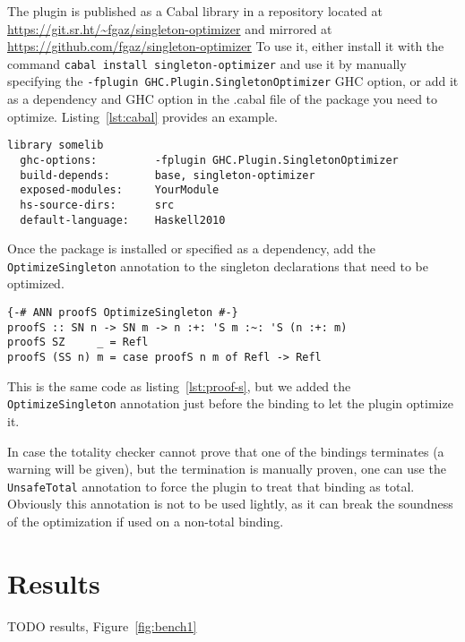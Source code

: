 The plugin is published as a Cabal library in a repository located at \url{https://git.sr.ht/~fgaz/singleton-optimizer} and mirrored at \url{https://github.com/fgaz/singleton-optimizer}
To use it, either install it with the command \texttt{cabal install singleton-optimizer} and use it by manually specifying the \texttt{-fplugin GHC.Plugin.SingletonOptimizer} GHC option, or add it as a dependency and GHC option in the .cabal file of the package you need to optimize.
Listing~\ref{lst:cabal} provides an example.

\begin{lstlisting}[label=lst:cabal, caption=Example .cabal stanza]
library somelib
  ghc-options:         -fplugin GHC.Plugin.SingletonOptimizer
  build-depends:       base, singleton-optimizer
  exposed-modules:     YourModule
  hs-source-dirs:      src
  default-language:    Haskell2010
\end{lstlisting}

Once the package is installed or specified as a dependency, add the \texttt{OptimizeSingleton} annotation to the singleton declarations that need to be optimized.

\begin{lstlisting}[caption=Optimizing \texttt{proofS}]
{-# ANN proofS OptimizeSingleton #-}
proofS :: SN n -> SN m -> n :+: 'S m :~: 'S (n :+: m)
proofS SZ     _ = Refl
proofS (SS n) m = case proofS n m of Refl -> Refl
\end{lstlisting}

This is the same code as listing~\ref{lst:proof-s}, but we added the \texttt{OptimizeSingleton} annotation just before the binding to let the plugin optimize it.

In case the totality checker cannot prove that one of the bindings terminates (a warning will be given), but the termination is manually proven, one can use the \texttt{UnsafeTotal} annotation to force the plugin to treat that binding as total.
Obviously this annotation is not to be used lightly, as it can break the soundness of the optimization if used on a non-total binding.

\chapter{Results}
\label{cha:results}

TODO results, Figure~\ref{fig:bench1}

